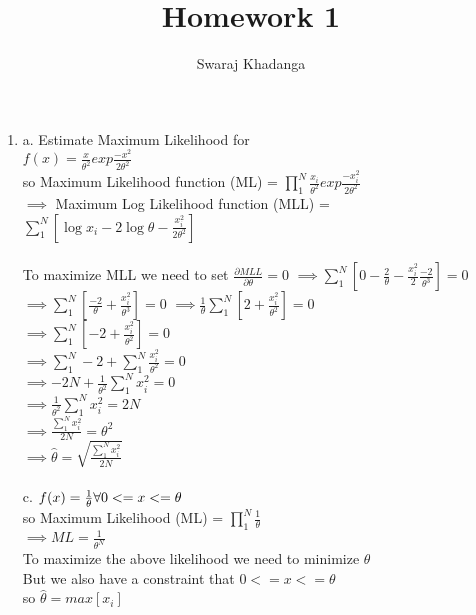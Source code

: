 \documentclass[]{report}
\title{Homework 1}
\author{Swaraj Khadanga}
\begin{document}
\maketitle

\begin{enumerate}
	\item a. Estimate Maximum Likelihood for \\
	$f(x)=\frac{x}{\theta^2}exp{\frac{-x^2}{2\theta^2}}$\\
	so Maximum Likelihood function (ML) = $\prod_{1}^{N}\frac{x_{i}}{\theta^2}exp{\frac{-x_{i}^2}{2\theta^2}}$ \\
	$\implies$ Maximum Log Likelihood function (MLL) = \\
	 $\sum_{1}^{N}[\log x_{i}-2\log \theta-\frac{x_{i}^2}{2\theta^2}]$ \\ \\
	To maximize MLL we need to set $\frac{\partial MLL}{\partial \theta} = 0$
	$\implies \sum_{1}^{N}[0-\frac{2}{\theta}-\frac{x_{i}^2}{2} \frac{-2}{\theta^3}] = 0$ \\
	$\implies \sum_{1}^{N}[\frac{-2}{\theta}+\frac{x_{i}^2}{\theta^3}] = 0$	
	$\implies \frac{1}{\theta}\sum_{1}^{N}[2+\frac{x_{i}^2}{\theta^2}] = 0$	\\
	$\implies \sum_{1}^{N}[-2+\frac{x_{i}^2}{\theta^2}] = 0$		\\
	$\implies \sum_{1}^{N}-2+ \sum_{1}^{N}\frac{x_{i}^2}{\theta^2} = 0$		\\
	$\implies -2N+ \frac{1}{\theta^2}\sum_{1}^{N}x_{i}^2 = 0$		\\
	$\implies \frac{1}{\theta^2}\sum_{1}^{N}x_{i}^2 = 2N$		\\
	$\implies \frac{\sum_{1}^{N}x_{i}^2}{2N} = \theta^2$		\\	
	$\implies \hat{\theta} = \sqrt{\frac{\sum_{1}^{N}x_{i}^2}{2N}}$		\\	
	\\
	c. $f(x)= \frac{1}{\theta} \space\space\space \forall 0 <= x <= \theta$\\
	so Maximum Likelihood (ML) = $\prod_{1}^{N}\frac{1}{\theta}$\\
	$\implies ML =\frac{1}{\theta^N}$\\
	To maximize the above likelihood we need to minimize $\theta$ \\
	But we also have a constraint that $0 <= x <= \theta$
	\\so $\hat{\theta} = max[{x_{i}}]$
\end{enumerate}
\end{document}
